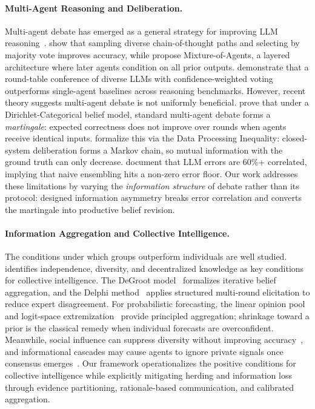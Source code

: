 \paragraph{Multi-Agent Reasoning and Deliberation.}
Multi-agent debate has emerged as a general strategy for improving LLM reasoning~\citep{du2023improving}.
\citet{wangself} show that sampling diverse chain-of-thought paths and selecting by majority vote improves accuracy, while \citet{wangmixture} propose Mixture-of-Agents, a layered architecture where later agents condition on all prior outputs.
\citet{chen2024reconcile} demonstrate that a round-table conference of diverse LLMs with confidence-weighted voting outperforms single-agent baselines across reasoning benchmarks.
However, recent theory suggests multi-agent debate is not uniformly beneficial.
\citet{choi2025debate} prove that under a Dirichlet-Categorical belief model, standard multi-agent debate forms a \textit{martingale}: expected correctness does not improve over rounds when agents receive identical inputs.
\citet{shin2026reasoning} formalize this via the Data Processing Inequality: closed-system deliberation forms a Markov chain, so mutual information with the ground truth can only decrease.
\citet{kim2025correlated} document that LLM errors are 60\%+ correlated, implying that naive ensembling hits a non-zero error floor.
Our work addresses these limitations by varying the \emph{information structure} of debate rather than its protocol: designed information asymmetry breaks error correlation and converts the martingale into productive belief revision.

\paragraph{Information Aggregation and Collective Intelligence.}
The conditions under which groups outperform individuals are well studied.
\citet{surowiecki2004wisdom} identifies independence, diversity, and decentralized knowledge as key conditions for collective intelligence.
The DeGroot model~\citep{612bb50a-4bdd-3a32-b6eb-7837600cc9c4} formalizes iterative belief aggregation, and the Delphi method~\citep{DALKEY1969408} applies structured multi-round elicitation to reduce expert disagreement.
For probabilistic forecasting, the linear opinion pool~\citep{9ca5e582-1e4c-323f-9ab1-c62032d22e48} and logit-space extremization~\citep{SATOPAA2014344} provide principled aggregation; shrinkage toward a prior is the classical remedy when individual forecasts are overconfident.
Meanwhile, social influence can suppress diversity without improving accuracy~\citep{Lorenz2011HowSI}, and informational cascades may cause agents to ignore private signals once consensus emerges~\citep{bikhchandani1992theory}.
Our framework operationalizes the positive conditions for collective intelligence while explicitly mitigating herding and information loss through evidence partitioning, rationale-based communication, and calibrated aggregation.

